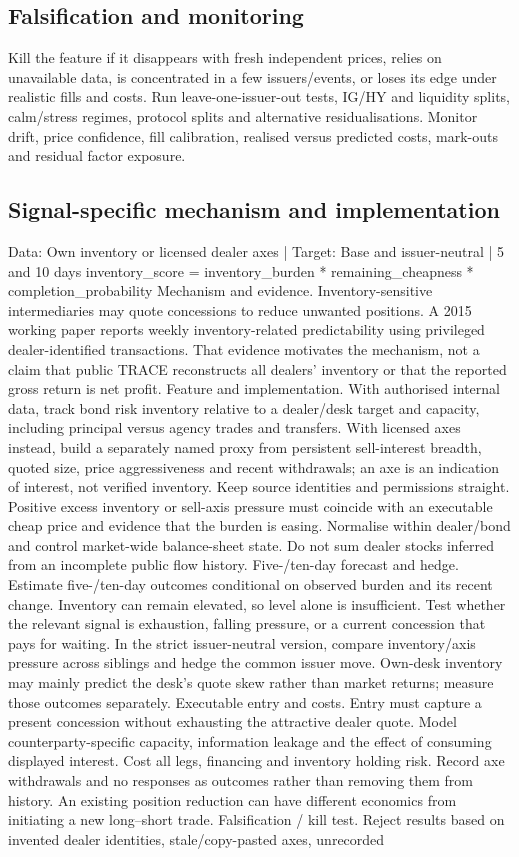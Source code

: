 \documentclass[10pt]{article}
\begin{document}
\subsection{Falsification and monitoring}
Kill the feature if it disappears with fresh independent prices, relies on unavailable data, is concentrated in a few issuers/events, or loses its edge under realistic fills and costs. Run leave-one-issuer-out tests, IG/HY and liquidity splits, calm/stress regimes, protocol splits and alternative residualisations. Monitor drift, price confidence, fill calibration, realised versus predicted costs, mark-outs and residual factor exposure.
\subsection{Signal-specific mechanism and implementation}
Data: Own inventory or licensed dealer axes  |  Target: Base and issuer-neutral  |  5 and 10 days inventory\_score = inventory\_burden * remaining\_cheapness * completion\_probability Mechanism and evidence.  Inventory-sensitive intermediaries may quote concessions to reduce unwanted positions. A 2015 working paper reports weekly inventory-related predictability using privileged dealer-identified transactions. That evidence motivates the mechanism, not a claim that public TRACE reconstructs all dealers’ inventory or that the reported gross return is net profit. Feature and implementation.  With authorised internal data, track bond risk inventory relative to a dealer/desk target and capacity, including principal versus agency trades and transfers. With licensed axes instead, build a separately named proxy from persistent sell-interest breadth, quoted size, price aggressiveness and recent withdrawals; an axe is an indication of interest, not verified inventory. Keep source identities and permissions straight. Positive excess inventory or sell-axis pressure must coincide with an executable cheap price and evidence that the burden is easing. Normalise within dealer/bond and control market-wide balance-sheet state. Do not sum dealer stocks inferred from an incomplete public flow history. Five-/ten-day forecast and hedge.  Estimate five-/ten-day outcomes conditional on observed burden and its recent change. Inventory can remain elevated, so level alone is insufficient. Test whether the relevant signal is exhaustion, falling pressure, or a current concession that pays for waiting. In the strict issuer-neutral version, compare inventory/axis pressure across siblings and hedge the common issuer move. Own-desk inventory may mainly predict the desk’s quote skew rather than market returns; measure those outcomes separately. Executable entry and costs.  Entry must capture a present concession without exhausting the attractive dealer quote. Model counterparty-specific capacity, information leakage and the effect of consuming displayed interest. Cost all legs, financing and inventory holding risk. Record axe withdrawals and no responses as outcomes rather than removing them from history. An existing position reduction can have different economics from initiating a new long--short trade. Falsification / kill test.  Reject results based on invented dealer identities, stale/copy-pasted axes, unrecorded 
\end{document}
